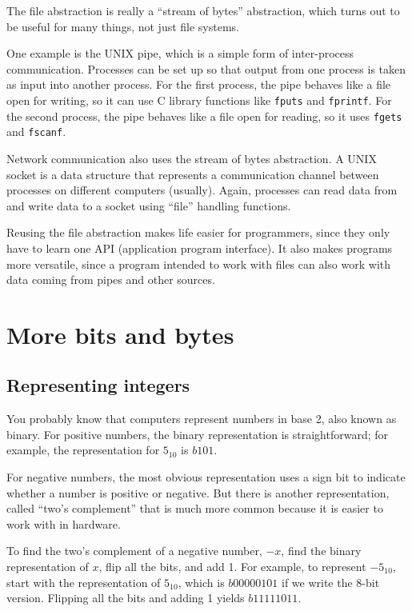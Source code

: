 \documentclass[12pt]{book}
\begin{document}
{The file abstraction is really a ``stream of bytes'' abstraction,
which turns out to be useful for many things, not just file systems.

One example is the UNIX pipe, which is a simple form of inter-process
communication.  Processes can be set up so that output from one
process is taken as input into another process.  For the first
process, the pipe behaves like a file open for writing, so it
can use C library functions like {\tt fputs} and {\tt fprintf}.
For the second process, the pipe behaves like a file open for
reading, so it uses {\tt fgets} and {\tt fscanf}.

Network communication also uses the stream of bytes abstraction.
A UNIX socket is a data structure that represents a communication
channel between processes on different computers (usually).  Again,
processes can read data from and write data to a socket using
``file'' handling functions.

Reusing the file abstraction makes life easier for programmers, since
they only have to learn one API (application program interface).
It also makes programs more versatile, since a program intended to
work with files can also work with data coming from pipes and other
sources.



\chapter{More bits and bytes}

\section{Representing integers}

You probably know that computers represent numbers in
base 2, also known as binary.  For positive numbers, the binary
representation is straightforward; for example, the representation
for $5_{10}$ is $b101$.

For negative numbers, the most obvious representation uses
a sign bit to indicate whether a number is positive or negative.
But there is another representation, called ``two's complement''
that is much more common because it is easier to work with
in hardware.

To find the two's complement of a negative number, $-x$, find
the binary representation of $x$, flip all the bits, and add 1.
For example, to represent $-5_{10}$, start with the representation
of $5_{10}$, which is $b0000 0101$ if we write the 8-bit version.
Flipping all the bits and adding 1 yields $b1111 1011$.

}
\end{document}
